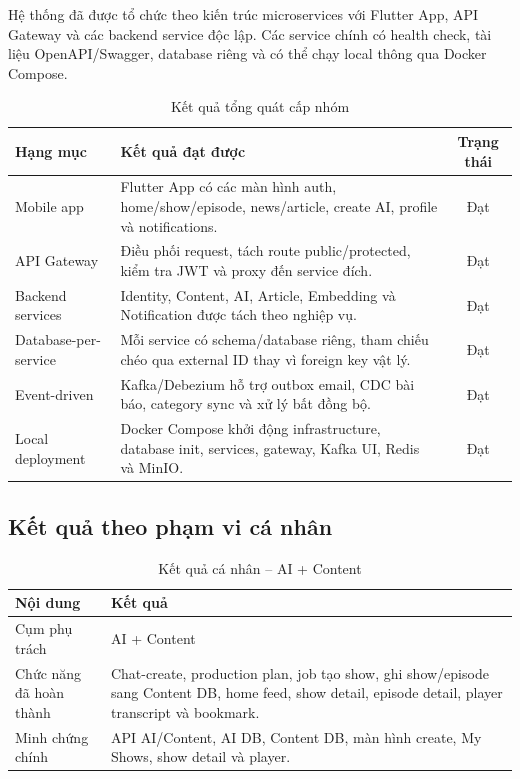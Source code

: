 \documentclass[14pt,a4paper,oneside]{extreport}
\begin{document}
Hệ thống đã được tổ chức theo kiến trúc microservices với Flutter App, API Gateway và các backend service độc lập. Các service chính có health check, tài liệu OpenAPI/Swagger, database riêng và có thể chạy local thông qua Docker Compose.

\begin{table}[H]
\centering
\caption{Kết quả tổng quát cấp nhóm}
\label{tab:ket-qua-tong-quat}
\renewcommand{\arraystretch}{1.3}
\small
\begin{tabularx}{\textwidth}{|l|X|c|}
\hline
\textbf{Hạng mục} & \textbf{Kết quả đạt được} & \textbf{Trạng thái} \\
\hline
Mobile app & Flutter App có các màn hình auth, home/show/episode, news/article, create AI, profile và notifications. & Đạt \\
\hline
API Gateway & Điều phối request, tách route public/protected, kiểm tra JWT và proxy đến service đích. & Đạt \\
\hline
Backend services & Identity, Content, AI, Article, Embedding và Notification được tách theo nghiệp vụ. & Đạt \\
\hline
Database-per-service & Mỗi service có schema/database riêng, tham chiếu chéo qua external ID thay vì foreign key vật lý. & Đạt \\
\hline
Event-driven & Kafka/Debezium hỗ trợ outbox email, CDC bài báo, category sync và xử lý bất đồng bộ. & Đạt \\
\hline
Local deployment & Docker Compose khởi động infrastructure, database init, services, gateway, Kafka UI, Redis và MinIO. & Đạt \\
\hline
\end{tabularx}
\end{table}

\subsection{Kết quả theo phạm vi cá nhân}

\begin{table}[H]
\centering
\caption{Kết quả cá nhân -- AI + Content}
\label{tab:ket-qua-ca-nhan}
\renewcommand{\arraystretch}{1.3}
\small
\begin{tabularx}{\textwidth}{|l|X|}
\hline
\textbf{Nội dung} & \textbf{Kết quả} \\
\hline
Cụm phụ trách & AI + Content \\
\hline
Chức năng đã hoàn thành & Chat-create, production plan, job tạo show, ghi show/episode sang Content DB, home feed, show detail, episode detail, player transcript và bookmark. \\
\hline
Minh chứng chính & API AI/Content, AI DB, Content DB, màn hình create, My Shows, show detail và player. \\
\hline
\end{tabularx}
\end{table}
\end{document}
